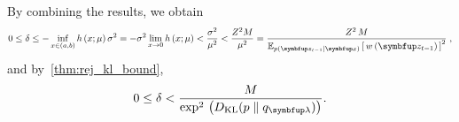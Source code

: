 \begin{proofEnd}
By combining the results, we obtain
\begin{align}
  0 \leq \delta
  \leq -\inf_{x \in (a,b)} h\,(x; \mu) \, \sigma^2
  = - \sigma^2 \lim_{x \rightarrow 0} h\,(x; \mu) 
  < \frac{\sigma^2}{\mu^2}
  < \frac{Z^2 M }{\mu^2}
  = \frac{
    Z^2 \, M
  }
  {
    {\Esub{p(\vz_{t-1}\mid\vx)}{ w\,(\vz_{t-1}) }}^2 
  }\;,
\end{align}
and by~\cref{thm:rej_kl_bound},
\begin{equation}
  0 \leq \delta < \frac{ M }{ \exp^2\,\big( \DKL{p}{q_{\vlambda}} \big) }.
\end{equation}
\end{proofEnd}

